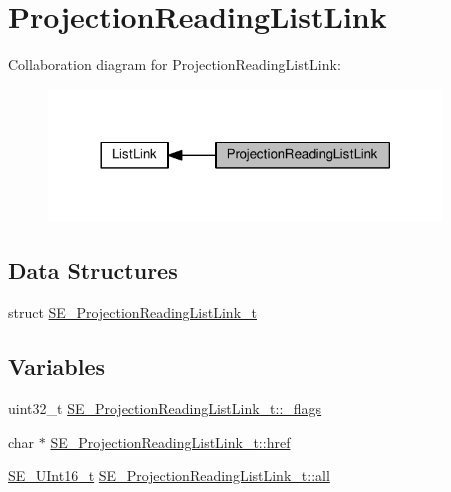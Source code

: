 \hypertarget{group__ProjectionReadingListLink}{}\section{Projection\+Reading\+List\+Link}
\label{group__ProjectionReadingListLink}
Collaboration diagram for Projection\+Reading\+List\+Link\+:\nopagebreak
\begin{figure}[H]
\begin{center}
\leavevmode
\includegraphics[width=296pt]{group__ProjectionReadingListLink}
\end{center}
\end{figure}
\subsection*{Data Structures}
\begin{DoxyCompactItemize}
\item 
struct \hyperlink{structSE__ProjectionReadingListLink__t}{S\+E\+\_\+\+Projection\+Reading\+List\+Link\+\_\+t}
\end{DoxyCompactItemize}
\subsection*{Variables}
\begin{DoxyCompactItemize}
\item 
uint32\+\_\+t \hyperlink{group__ProjectionReadingListLink_ga28822e53e74267ba142e26907d8f61ed}{S\+E\+\_\+\+Projection\+Reading\+List\+Link\+\_\+t\+::\+\_\+flags}
\item 
char $\ast$ \hyperlink{group__ProjectionReadingListLink_ga20949473f08a344c7982015365a5ab35}{S\+E\+\_\+\+Projection\+Reading\+List\+Link\+\_\+t\+::href}
\item 
\hyperlink{group__UInt16_gac68d541f189538bfd30cfaa712d20d29}{S\+E\+\_\+\+U\+Int16\+\_\+t} \hyperlink{group__ProjectionReadingListLink_ga7df090bbabfbd3611d690fac792b316e}{S\+E\+\_\+\+Projection\+Reading\+List\+Link\+\_\+t\+::all}
\end{DoxyCompactItemize}


